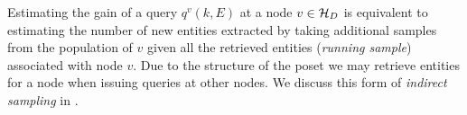 Estimating the gain of a query $q^v(k,E)$ at a node $v \in \mathcal{H}_D$ is equivalent to estimating the number of new entities extracted by taking additional samples from the population of $v$ given all the retrieved entities ({\em running sample}) associated with node $v$. Due to the structure of the poset we may retrieve entities for a node when issuing queries at other nodes. We discuss this form of {\em indirect sampling} in . 

%
%
